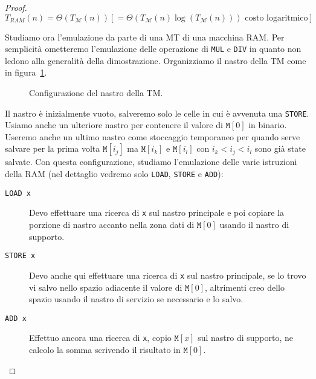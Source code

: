 \documentclass[a4paper,11pt,twoside]{article}
\theoremstyle{plain}
\theoremstyle{definition}
\theoremstyle{remark}
\begin{document}
\begin{proof}
  \[
    T_{RAM}(n) = \Theta(T_\mathcal{M}(n))
      [ = \Theta(T_\mathcal{M}(n)\log(T_\mathcal{M}(n))) \text{ costo logaritmico} ]
  \]

  Studiamo ora l'emulazione da parte di una MT di una macchina RAM\@. Per
  semplicità ometteremo l'emulazione delle operazione di \texttt{MUL} e
  \texttt{DIV} in quanto non ledono alla generalità della dimostrazione.
  Organizziamo il nastro della TM come in figura~\ref{fig:thm-corr-tm-ram}.

  \begin{figure}[htb]
    \centering
    \caption{Configurazione del nastro della TM\@.}%
    \label{fig:thm-corr-tm-ram}
  \end{figure}

  Il nastro è inizialmente vuoto, salveremo solo le celle in cui è avvenuta una
  \texttt{STORE}. Usiamo anche un ulteriore nastro per contenere il valore di
  $\mathtt{M}[0]$ in binario. Useremo anche un ultimo nastro come stoccaggio
  temporaneo per quando serve salvare per la prima volta $\mathtt{M}[i_j]$ ma
  $\mathtt{M}[i_k]$ e $\mathtt{M}[i_l]$ con $i_k < i_j < i_l$ sono già state
  salvate. Con questa configurazione, studiamo l'emulazione delle varie
  istruzioni della RAM (nel dettaglio vedremo solo \texttt{LOAD}, \texttt{STORE}
  e \texttt{ADD}):

  \begin{description}
    \item[\texttt{LOAD x}] Devo effettuare una ricerca di \texttt{x} sul nastro
      principale e poi copiare la porzione di nastro accanto nella zona dati di
      $\mathtt{M}[0]$ usando il nastro di supporto.
    \item[\texttt{STORE x}] Devo anche qui effettuare una ricerca di \texttt{x}
      sul nastro principale, se lo trovo vi salvo nello spazio adiacente il
      valore di $\mathtt{M}[0]$, altrimenti creo dello spazio usando il nastro
      di servizio se necessario e lo salvo.
    \item[\texttt{ADD x}] Effettuo ancora una ricerca di \texttt{x}, copio
      $\mathtt{M}[x]$ sul nastro di supporto, ne calcolo la somma scrivendo il
      risultato in $\mathtt{M}[0]$.
  \end{description}


\end{proof}
\end{document}
